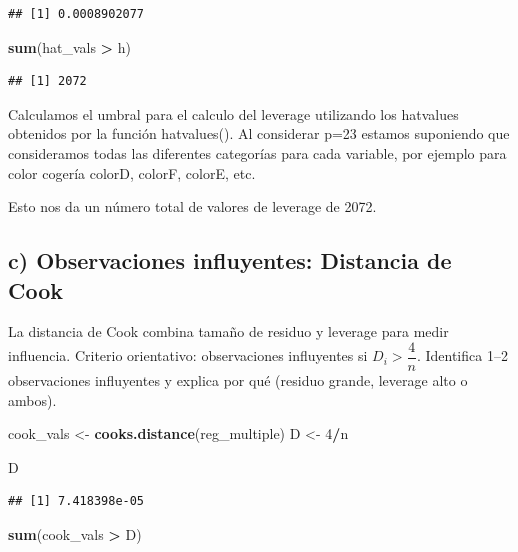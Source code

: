 \documentclass[
  spanish,
]{article}
\newenvironment{Shaded}{\begin{snugshade}}{\end{snugshade}}
\newcommand{\DecValTok}[1]{\textcolor[rgb]{0.00,0.00,0.81}{#1}}
\newcommand{\FunctionTok}[1]{\textcolor[rgb]{0.13,0.29,0.53}{\textbf{#1}}}
\newcommand{\NormalTok}[1]{#1}
\newcommand{\OtherTok}[1]{\textcolor[rgb]{0.56,0.35,0.01}{#1}}
\newcommand{\SpecialCharTok}[1]{\textcolor[rgb]{0.81,0.36,0.00}{\textbf{#1}}}
\begin{document}
\begin{verbatim}
## [1] 0.0008902077
\end{verbatim}

\begin{Shaded}
\begin{Highlighting}[]
\FunctionTok{sum}\NormalTok{(hat\_vals }\SpecialCharTok{\textgreater{}}\NormalTok{ h)}
\end{Highlighting}
\end{Shaded}

\begin{verbatim}
## [1] 2072
\end{verbatim}

Calculamos el umbral para el calculo del leverage utilizando los
hatvalues obtenidos por la función hatvalues(). Al considerar p=23
estamos suponiendo que consideramos todas las diferentes categorías para
cada variable, por ejemplo para color cogería colorD, colorF, colorE,
etc.

Esto nos da un número total de valores de leverage de 2072.

\subsection*{c) Observaciones influyentes: Distancia de
Cook}\label{c-observaciones-influyentes-distancia-de-cook}

La distancia de Cook combina tamaño de residuo y leverage para medir
influencia. Criterio orientativo: observaciones influyentes si
\(D_i > \dfrac{4}{n}\). Identifica 1--2 observaciones influyentes y
explica por qué (residuo grande, leverage alto o ambos).

\begin{Shaded}
\begin{Highlighting}[]
\NormalTok{cook\_vals }\OtherTok{\textless{}{-}} \FunctionTok{cooks.distance}\NormalTok{(reg\_multiple)}
\NormalTok{D }\OtherTok{\textless{}{-}} \DecValTok{4}\SpecialCharTok{/}\NormalTok{n}

\NormalTok{D}
\end{Highlighting}
\end{Shaded}

\begin{verbatim}
## [1] 7.418398e-05
\end{verbatim}

\begin{Shaded}
\begin{Highlighting}[]
\FunctionTok{sum}\NormalTok{(cook\_vals }\SpecialCharTok{\textgreater{}}\NormalTok{ D)}
\end{Highlighting}
\end{Shaded}
\end{document}
